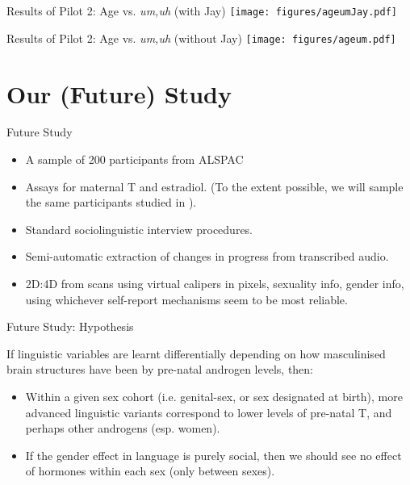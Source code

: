 \documentclass[hyperref={pdfpagelabels=false}]{beamer}
\begin{document}
\begin{frame}{Results of Pilot 2: Age vs. \textsl{um,uh} (with Jay)}
\texttt{[image: figures/ageumJay.pdf]}
\end{frame}


\begin{frame}{Results of Pilot 2: Age vs. \textsl{um,uh} (without Jay)}
\texttt{[image: figures/ageum.pdf]}
\end{frame}


\section{Our (Future) Study}

\begin{frame}{Future Study}
\begin{itemize}
	\item A sample of 200 participants from ALSPAC
	\item Assays for maternal T and estradiol. (To the extent possible, we will sample the same participants studied in \citealt{hinesetal2002}). 
	\item Standard sociolinguistic interview procedures.
	\item Semi-automatic extraction of changes in progress from transcribed audio.
	\item 2D:4D from scans using virtual calipers in pixels, sexuality info, gender info, using whichever self-report mechanisms seem to be most reliable.
\end{itemize}
\end{frame}


\begin{frame}{Future Study: Hypothesis}

\begin{center}
\item If linguistic variables are learnt differentially depending on how masculinised brain structures have been by pre-natal androgen levels, then:
\end{center} 
\begin{itemize}
	\item Within a given sex cohort (i.e. genital-sex, or sex designated at birth), more advanced linguistic variants correspond to lower levels of pre-natal T, and perhaps other androgens (esp. women).
	\item If the gender effect in language is purely social, then we should see no effect of hormones within each sex (only between sexes).
\end{itemize}
\end{frame}
\end{document}
